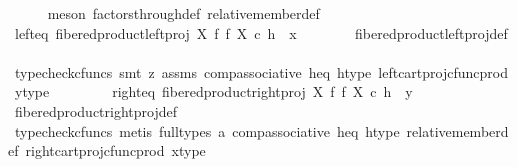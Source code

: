\begin{isabellebody}
\ \ \ \ \isamarkupfalse%
\ {\isacharparenleft}{\kern0pt}meson\ factors{\isacharunderscore}{\kern0pt}through{\isacharunderscore}{\kern0pt}def{}\ relative{\isacharunderscore}{\kern0pt}member{\isacharunderscore}{\kern0pt}def{}{\isacharparenright}{\kern0pt}\isanewline
\isanewline
\ \ \isamarkupfalse%
\ left{\isacharunderscore}{\kern0pt}eq{\isacharcolon}{\kern0pt}\ {\isachardoublequoteopen}fibered{\isacharunderscore}{\kern0pt}product{\isacharunderscore}{\kern0pt}left{\isacharunderscore}{\kern0pt}proj\ X\ f\ f\ X\ {\isasymcirc}\isactrlsub c\ h\ {\isacharequal}{\kern0pt}\ x{\isachardoublequoteclose}\isanewline
\ \ \ \ \ \ \isamarkupfalse%
\ fibered{\isacharunderscore}{\kern0pt}product{\isacharunderscore}{\kern0pt}left{\isacharunderscore}{\kern0pt}proj{\isacharunderscore}{\kern0pt}def\isanewline
\ \ \ \ \ \ \isamarkupfalse%
\ {\isacharparenleft}{\kern0pt}typecheck{\isacharunderscore}{\kern0pt}cfuncs{\isacharcomma}{\kern0pt}\ smt\ {\isacharparenleft}{\kern0pt}z{}{\isacharparenright}{\kern0pt}\ assms{\isacharparenleft}{\kern0pt}{}{\isacharparenright}{\kern0pt}\ comp{\isacharunderscore}{\kern0pt}associative{}\ h{\isacharunderscore}{\kern0pt}eq\ h{\isacharunderscore}{\kern0pt}type\ left{\isacharunderscore}{\kern0pt}cart{\isacharunderscore}{\kern0pt}proj{\isacharunderscore}{\kern0pt}cfunc{\isacharunderscore}{\kern0pt}prod\ y{\isacharunderscore}{\kern0pt}type{\isacharparenright}{\kern0pt}\isanewline
\ \ \ \ \isanewline
\ \ \isamarkupfalse%
\ right{\isacharunderscore}{\kern0pt}eq{\isacharcolon}{\kern0pt}\ {\isachardoublequoteopen}fibered{\isacharunderscore}{\kern0pt}product{\isacharunderscore}{\kern0pt}right{\isacharunderscore}{\kern0pt}proj\ X\ f\ f\ X\ {\isasymcirc}\isactrlsub c\ h\ {\isacharequal}{\kern0pt}\ y{\isachardoublequoteclose}\isanewline
\ \ \ \ \isamarkupfalse%
\ fibered{\isacharunderscore}{\kern0pt}product{\isacharunderscore}{\kern0pt}right{\isacharunderscore}{\kern0pt}proj{\isacharunderscore}{\kern0pt}def\isanewline
\ \ \ \ \isamarkupfalse%
\ {\isacharparenleft}{\kern0pt}typecheck{\isacharunderscore}{\kern0pt}cfuncs{\isacharcomma}{\kern0pt}\ metis\ {\isacharparenleft}{\kern0pt}full{\isacharunderscore}{\kern0pt}types{\isacharparenright}{\kern0pt}\ a{}\ comp{\isacharunderscore}{\kern0pt}associative{}\ h{\isacharunderscore}{\kern0pt}eq\ h{\isacharunderscore}{\kern0pt}type\ relative{\isacharunderscore}{\kern0pt}member{\isacharunderscore}{\kern0pt}def{}\ right{\isacharunderscore}{\kern0pt}cart{\isacharunderscore}{\kern0pt}proj{\isacharunderscore}{\kern0pt}cfunc{\isacharunderscore}{\kern0pt}prod\ x{\isacharunderscore}{\kern0pt}type{\isacharparenright}{\kern0pt}\isanewline

\end{isabellebody}
